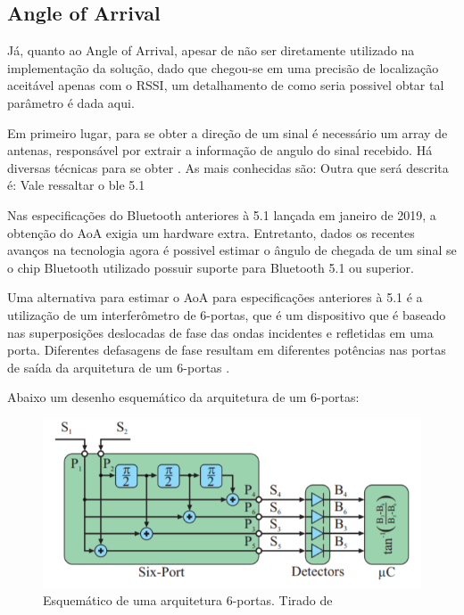 \subsection{Angle of Arrival}
Já, quanto ao Angle of Arrival, apesar de não ser diretamente utilizado na implementação da solução, dado que chegou-se em uma precisão de localização aceitável apenas com o RSSI, um detalhamento de como seria possivel obtar tal parâmetro é dada aqui.

Em primeiro lugar, para se obter a direção de um sinal é necessário um array de antenas, responsável por extrair a informação de angulo do sinal recebido. Há diversas técnicas para se obter . As mais conhecidas são: Outra que será descrita é:
Vale ressaltar o ble 5.1

Nas especificações do Bluetooth anteriores à 5.1 lançada em janeiro de 2019, a obtenção do AoA exigia um hardware extra.
Entretanto, dados os recentes avanços na tecnologia agora é possivel estimar o ângulo de chegada de um sinal se o chip Bluetooth utilizado possuir suporte para Bluetooth 5.1 ou superior.

Uma alternativa para estimar o AoA para especificações anteriores à 5.1 é a utilização de um interferômetro de 6-portas, que é um dispositivo que é baseado nas superposições deslocadas de fase das ondas incidentes e refletidas em uma porta. Diferentes defasagens de fase resultam em diferentes potências nas portas de saída da arquitetura de um 6-portas \cite{art14}.

Abaixo um desenho esquemático da arquitetura de um 6-portas: 

\begin{figure}[H]
	\centering 
	\includegraphics[scale = 1]{images/six_port_schematic.png}
	\caption{Esquemático de uma arquitetura 6-portas. Tirado de \cite{art15} }
	\label{fig:six_port_schematic}
\end{figure}

